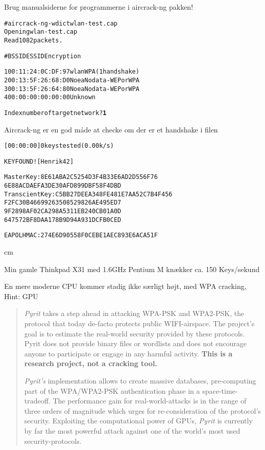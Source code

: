 \documentclass[Screen16to9,17pt]{foils}
\begin{document}
\centerline{Brug manualsiderne for programmerne i aircrack-ng pakken!}


\begin{alltt}
\small
# aircrack-ng -w dict wlan-test.cap
Opening wlan-test.cap
Read 1082 packets.

#  BSSID              ESSID           Encryption

1  00:11:24:0C:DF:97  wlan            WPA (1 handshake)
2  00:13:5F:26:68:D0  Noea            No data - WEP or WPA
3  00:13:5F:26:64:80  Noea            No data - WEP or WPA
4  00:00:00:00:00:00                  Unknown

Index number of target network ? {\bf 1}
\end{alltt}

Aircrack-ng er en god måde at checke om der er et handshake i filen


\begin{alltt}
\small
          [00:00:00] 0 keys tested (0.00 k/s)

                    KEY FOUND! [ Henrik42 ]

Master Key     : 8E 61 AB A2 C5 25 4D 3F 4B 33 E6 AD 2D 55 6F 76
                 6E 88 AC DA EF A3 DE 30 AF D8 99 DB F5 8F 4D BD
Transcient Key : C5 BB 27 DE EA 34 8F E4 81 E7 AA 52 C7 B4 F4 56
                 F2 FC 30 B4 66 99 26 35 08 52 98 26 AE 49 5E D7
                 9F 28 98 AF 02 CA 29 8A 53 11 EB 24 0C B0 1A 0D
                 64 75 72 BF 8D AA 17 8B 9D 94 A9 31 DC FB 0C ED

EAPOL HMAC     : 27 4E 6D 90 55 8F 0C EB E1 AE C8 93 E6 AC A5 1F

\end{alltt}

 cm

\centerline{Min gamle Thinkpad X31 med 1.6GHz Pentium M knækker ca. 150 Keys/sekund}

En mere moderne CPU kommer stadig ikke særligt højt, med WPA cracking, Hint: GPU





\begin{quote}
\emph{Pyrit} takes a step ahead in attacking WPA-PSK and WPA2-PSK, the protocol that today de-facto protects public WIFI-airspace. The project's goal is to estimate the real-world security provided by these protocols. Pyrit does not provide binary files or wordlists and does not encourage anyone to participate or engage in any harmful activity. {\bf This is a research project, not a cracking tool.}

\emph{Pyrit's} implementation allows to create massive databases, pre-computing part of the WPA/WPA2-PSK authentication phase in a space-time-tradeoff. The performance gain for real-world-attacks is in the range of three orders of magnitude which urges for re-consideration of the protocol's security. Exploiting the computational power of GPUs, \emph{Pyrit} is currently by far the most powerful attack against one of the world's most used security-protocols.
\end{quote}
\end{document}
